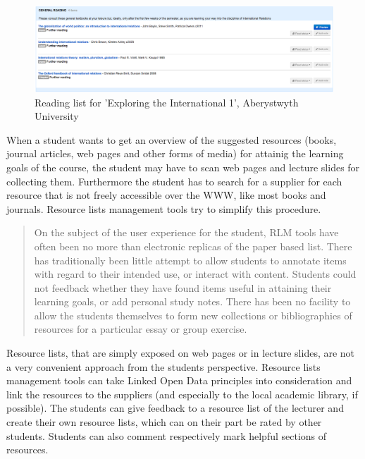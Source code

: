 \documentclass{article}
\begin{document}
\begin{figure}[t]
\centering \includegraphics*[width=0.9\columnwidth]{images/rlm-tools/aber-explore-1.png}
\caption{Reading list for 'Exploring the International 1', Aberystwyth University}
\label{fig:rlm-aber-1}
\end{figure}

When a student wants to get an overview of the suggested resources (books, journal articles, web pages and other forms of media) for attainig the learning goals of the course, the student may have to scan web pages and lecture slides for collecting them. Furthermore the student has to search for a supplier for each resource that is not freely accessible over the WWW, like most books and journals. Resource lists management tools try to simplify this procedure. \begin{quote}On the subject of the user experience for the student, RLM tools have often been no more than electronic replicas of the paper based list. There has traditionally been little attempt to allow students to annotate items with regard to their intended use, or interact with content. Students could not feedback whether they have found items useful in attaining their learning goals, or add personal study notes. There has been no facility to allow the students themselves to form new collections or bibliographies of resources for a particular essay or group exercise.\cite{clarke_resource_2009}\end{quote} Resource lists, that are simply exposed on web pages or in lecture slides, are not a very convenient approach from the students perspective. Resource lists management tools can take Linked Open Data principles into consideration and link the resources to the suppliers (and especially to the local academic library, if possible). The students can give feedback to a resource list of the lecturer and create their own resource lists, which can on their part be rated by other students. Students can also comment respectively mark helpful sections of resources.
\end{document}
